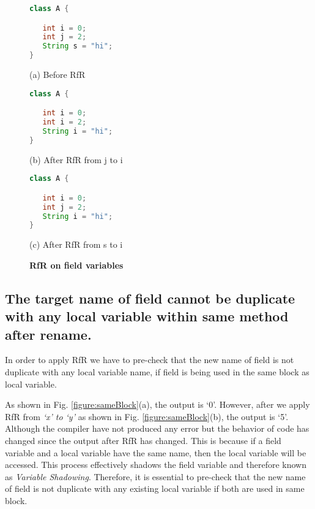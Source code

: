 \begin{figure}[th]
\centering	
\begin{minipage}[t]{0.45\linewidth}
\begin{lstlisting}[language=java, basicstyle=\scriptsize\ttfamily,frame=single]
class A {

   int i = 0;
   int j = 2;
   String s = "hi";
}

\end{lstlisting}
\centering(a) Before RfR
\end{minipage}
\hfill
\begin{minipage}[t]{0.45\linewidth}
\begin{lstlisting}[language=java, basicstyle=\scriptsize\ttfamily,frame=single]
class A {

   int i = 0;
   int i = 2;
   String i = "hi";
}
\end{lstlisting}
\centering(b) After RfR from j to i
\end{minipage}

\centering
\begin{minipage}[t]{0.45\linewidth}
\begin{lstlisting}[language=java, basicstyle=\scriptsize\ttfamily,frame=single]
class A {

   int i = 0;
   int j = 2;
   String i = "hi";
}
\end{lstlisting}
\centering(c) After RfR from s to i
\end{minipage}
\caption{\textbf{RfR on field variables}}
\label{figure:field}
\end{figure}


\subsection{The target name of field cannot be duplicate with any local variable within same method after rename.}
In order to apply RfR we have to pre-check that the new name of field is not duplicate with any local variable name, if field is being used in the same block as local variable. 

As shown in Fig. \ref{figure:sameBlock}(a), the output is `0'. However, after we apply RfR from \emph{`x' to `y'} as shown in Fig. \ref{figure:sameBlock}(b), the output is `5'. Although the compiler have not produced any error but the behavior of code has changed since the output after RfR has changed. This is because if a field variable and a local variable have the same name, then the local variable will be accessed. This process effectively shadows the field variable and therefore known as \textit{Variable Shadowing}. Therefore, it is essential to pre-check that the new name of field is not duplicate with any existing local variable if both are used in same block.
 

